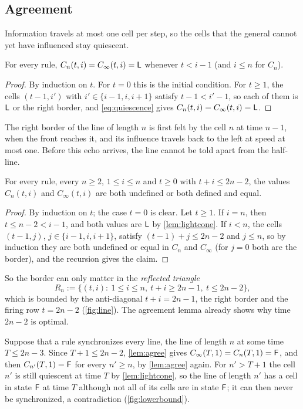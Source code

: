 \subsection{Agreement}

Information travels at most one cell per step, so the cells that the general
cannot yet have influenced stay quiescent.

\begin{lemma}\label{lem:lightcone}
For every rule, $C_n(t,i)=C_\infty(t,i)=\mathsf L$ whenever $t<i-1$ (and $i\le n$
for $C_n$).
\end{lemma}

\begin{proof}
By induction on $t$. For $t=0$ this is the initial condition. For $t\ge1$, the
cells $(t-1,i')$ with $i'\in\{i-1,i,i+1\}$ satisfy $t-1<i'-1$, so each of them
is $\mathsf L$ or the right border, and \eqref{eq:quiescence} gives
$C_n(t,i)=C_\infty(t,i)=\mathsf L$.
\end{proof}

The right border of the line of length $n$ is first felt by the cell $n$ at
time $n-1$, when the front reaches it, and its influence travels back to the
left at speed at most one. Before this echo arrives, the line cannot be told
apart from the half-line.

\begin{lemma}[agreement]\label{lem:agree}
For every rule, every $n\ge2$, $1\le i\le n$ and $t\ge0$ with $t+i\le 2n-2$,
the values $C_n(t,i)$ and $C_\infty(t,i)$ are both undefined or both defined
and equal.
\end{lemma}

\begin{proof}
By induction on $t$; the case $t=0$ is clear. Let $t\ge1$. If $i=n$, then
$t\le n-2<i-1$, and both values are $\mathsf L$ by \cref{lem:lightcone}. If $i<n$,
the cells $(t-1,j)$, $j\in\{i-1,i,i+1\}$, satisfy $(t-1)+j\le 2n-2$ and $j\le
n$, so by induction they are both undefined or equal in $C_n$ and $C_\infty$
(for $j=0$ both are the border), and the recursion gives the claim.
\end{proof}

So the border can only matter in the \emph{reflected triangle}
\[
R_n:=\{(t,i):\ 1\le i\le n,\ t+i\ge 2n-1,\ t\le 2n-2\},
\]
which is bounded by the anti-diagonal $t+i=2n-1$, the right border and the
firing row $t=2n-2$ (\cref{fig:line}). The agreement lemma already shows why
time $2n-2$ is optimal.

\begin{remark}\label{rem:lowerbound}
Suppose that a rule synchronizes every line, the line of length $n$ at some
time $T\le 2n-3$. Since $T+1\le 2n-2$, \cref{lem:agree} gives
$C_\infty(T,1)=C_n(T,1)=\mathsf F$, and then $C_{n'}(T,1)=\mathsf F$ for every $n'\ge n$,
by \cref{lem:agree} again. For $n'>T+1$ the cell $n'$ is still quiescent at
time $T$ by \cref{lem:lightcone}, so the line of length $n'$ has a cell in
state $\mathsf F$ at time $T$ although not all of its cells are in state $\mathsf F$; it
can then never be synchronized, a contradiction (\cref{fig:lowerbound}).
\end{remark}

